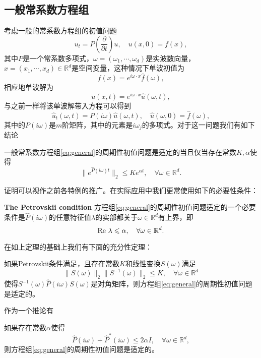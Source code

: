 \documentclass[a4paper,10pt]{ctexart}
\begin{document}
\subsection{一般常系数方程组}
考虑一般的常系数方程组的初值问题
\begin{equation}\label{eq:general}
    u_t = P \left( \dfrac{\partial }{\partial t}  \right) u,\quad u(x,0) = f(x),
\end{equation}
其中$ P $是一个常系数多项式，$ \omega = (\omega_1, \cdots , \omega_d) $是实波数向量，$ x = (x_1,\cdots ,x_d)\in \mathbb{R}^d $是空间变量，这种情况下单波初值为
\[
    f(x) = e^{i \omega \cdot x} \hat{f}(\omega),
\]
相应地单波解为
\begin{equation}
    u(x,t) = e^{i \omega \cdot x} \hat{u}(\omega,t),
\end{equation}
与之前一样将该单波解带入方程可以得到
\begin{equation}
    \hat{u}_t(\omega,t) = P(i \omega) \hat{u}(\omega,t), \quad \hat{u}(\omega,0) = \hat{f}(\omega),
\end{equation}
其中的$ P(i \omega) $是$ m $阶矩阵，其中的元素是$ i \omega_j $的多项式。对于这一问题我们有如下结论
\begin{theorem}
    一般常系数方程组\eqref{eq:general}的周期性初值问题是适定的当且仅当存在常数$ K,\alpha $使得
    \begin{equation}
        \| e^{\hat{P}(i \omega)t} \|_2 \leqslant K e^{\alpha t},\quad \forall \omega\in \mathbb{R}^d.
    \end{equation}
\end{theorem}
证明可以视作之前各特例的推广。在实际应用中我们更常使用如下的必要性条件：
\begin{theorem}{\normalfont\bf{The Petrovskii condition}}
    方程组\eqref{eq:general}的周期性初值问题适定的一个必要条件是$ \hat{P}(i \omega) $的任意特征值$ \lambda $的实部都关于$ \omega\in \mathbb{R}^d $有上界，即
    \begin{equation}
        {\rm Re}\ \lambda \leqslant \alpha,\quad \forall \omega\in \mathbb{R}^d.
    \end{equation}
\end{theorem}
在如上定理的基础上我们有下面的充分性定理：
\begin{theorem}
    如果Petrovskii条件满足，且存在常数$ K $和线性变换$ S(\omega) $满足
    \begin{equation}
        \| S(\omega) \|_2 \| S^{-1}(\omega) \|_2 \leqslant K,\quad \forall \omega\in \mathbb{R}^d
    \end{equation}
    使得$ S^{-1}(\omega)\hat{P}(i \omega)S(\omega) $是对角矩阵，则方程组\eqref{eq:general}的周期性初值问题是适定的。
\end{theorem}
作为一个推论有
\begin{corollary}
    如果存在常数$ \alpha $使得
    \begin{equation}
        \hat{P}(i \omega) + \hat{P}^*(i \omega) \leqslant 2\alpha I,\quad \forall \omega\in \mathbb{R}^d,
    \end{equation}
    则方程组\eqref{eq:general}的周期性初值问题是适定的。
\end{corollary}
\end{document}
